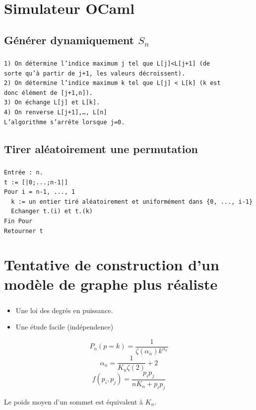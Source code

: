 \documentclass[11pt]{beamer}
\begin{document}
\section{Simulateur OCaml}

\subsection{Générer dynamiquement $S_n$}

\begin{frame}[fragile]
\frametitle{\insertsubsection}

\begin{scriptsize}
\begin{verbatim}
1) On détermine l’indice maximum j tel que L[j]<L[j+1] (de
sorte qu’à partir de j+1, les valeurs décroissent).
2) On détermine l’indice maximum k tel que L[j] < L[k] (k est
donc élément de [j+1,n]).
3) On échange L[j] et L[k].
4) On renverse L[j+1],…, L[n]
L’algorithme s’arrête lorsque j=0.
\end{verbatim}
\end{scriptsize}
\end{frame}

\subsection{Tirer aléatoirement une permutation}

\begin{frame}[fragile]
\frametitle{\insertsubsection}

\begin{scriptsize}
\begin{verbatim}
Entrée : n.
t := [|0;...;n-1|]
Pour i = n-1, ..., 1
  k := un entier tiré aléatoirement et uniformément dans {0, ..., i-1}
  Echanger t.(i) et t.(k)
Fin Pour
Retourner t
\end{verbatim}
\end{scriptsize}
\end{frame}

\section{Tentative de construction d'un modèle de graphe plus réaliste}

\begin{frame}
\frametitle{\insertsection}
\begin{itemize}
\item Une loi des degrés en puissance.
\item Une étude facile (indépendence)
\end{itemize}
\[P_n(p = k) = \frac{1}{\zeta(\alpha_n)k^{\alpha_n}}\] \[\alpha_n = \frac{1}{K_n \zeta(2)} + 2\]
\[f(p_i,p_j) = \frac{p_i p_j}{n K_n + p_i p_j}\]
\begin{proposition}
Le poids moyen d'un sommet est équivalent à $K_n$.
\end{proposition}
\end{frame}
\end{document}
